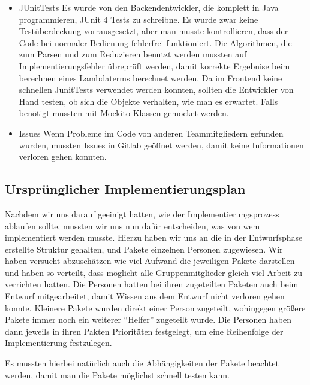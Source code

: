 \documentclass[parskip=full,11pt,twoside]{scrartcl}
\begin{document}
\begin{itemize}
       \item JUnitTests
       \newline
      	Es wurde von den Backendentwickler, die komplett in Java programmieren, JUnit 4 Tests zu schreibne.
      	Es wurde zwar keine Testüberdeckung vorrausgesetzt, aber man musste kontrollieren, dass der Code bei normaler Bedienung fehlerfrei funktioniert.
      	 Die Algorithmen, die zum Parsen und zum Reduzieren benutzt werden mussten auf Implementierungsfehler übreprüft werden, damit korrekte Ergebnise beim berechnen eines Lambdaterms berechnet werden.
      	Da im Frontend keine schnellen JunitTests verwendet werden konnten, sollten die Entwickler von Hand testen, ob sich die Objekte verhalten, wie man es erwartet.
      	Falls benötigt mussten mit Mockito Klassen gemocket werden.
      	\item Issues
      	Wenn Probleme im Code von anderen Teammitgliedern gefunden wurden, mussten Issues in Gitlab geöffnet werden, damit keine Informationen verloren gehen konnten.
      	\end{itemize}

\subsection{Ursprünglicher Implementierungsplan}
Nachdem wir uns darauf geeinigt hatten, wie der Implementierungsprozess ablaufen sollte, mussten wir uns nun dafür entscheiden, was von wem implementiert werden musste.
Hierzu haben wir uns an die in der Entwurfsphase erstellte Struktur gehalten, und Pakete einzelnen Personen zugewiesen.
Wir haben versucht abzuschätzen wie viel Aufwand die jeweiligen Pakete darstellen und haben so verteilt, dass möglicht alle Gruppenmitglieder gleich viel Arbeit zu verrichten hatten.
Die Personen hatten bei ihren zugeteilten Paketen auch beim Entwurf mitgearbeitet, damit Wissen aus dem Entwurf nicht verloren gehen konnte.
Kleinere Pakete wurden direkt einer Person zugeteilt, wohingegen größere Pakete immer noch ein weiterer \enquote{Helfer} zugeteilt wurde.
Die Personen haben dann jeweils in ihren Pakten Prioritäten festgelegt, um eine Reihenfolge der Implementierung festzulegen.

Es mussten hierbei natürlich auch die Abhängigkeiten der Pakete beachtet werden, damit man die Pakete möglichst schnell testen kann.
\end{document}
